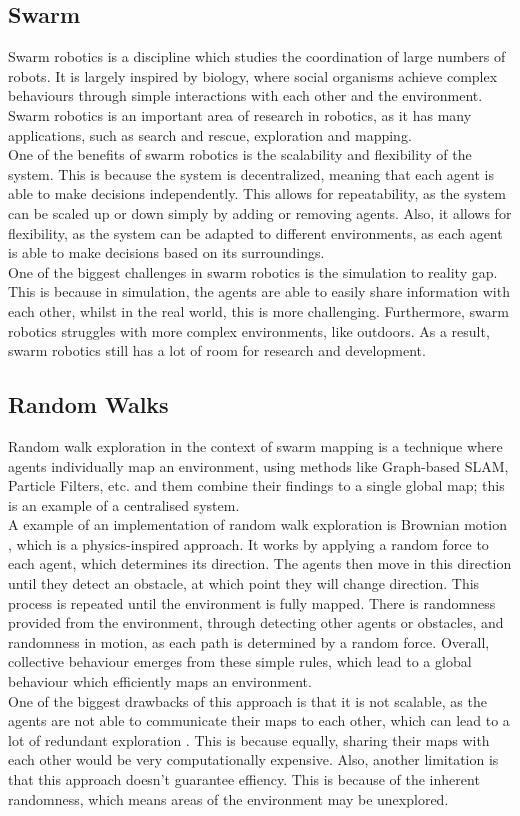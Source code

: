 \documentclass[12pt]{article}
\begin{document}
\subsection{Swarm}
Swarm robotics \cite{intro_to_swarm} is a discipline which studies the coordination of large numbers of robots. It is largely inspired by biology,
where social organisms achieve complex behaviours through simple interactions with each other and the environment. Swarm
robotics is an important area of research in robotics, as it has many applications, such as search and rescue, exploration
and mapping.\\
One of the benefits of swarm robotics is the scalability and flexibility of the system. This is because the system is
decentralized, meaning that each agent is able to make decisions independently. This allows for repeatability, as the system
can be scaled up or down simply by adding or removing agents. Also, it allows for flexibility, as the system can be adapted
to different environments, as each agent is able to make decisions based on its surroundings.\\
One of the biggest challenges in swarm robotics is the simulation to reality gap. This is because in simulation, the agents
are able to easily share information with each other, whilst in the real world, this is more challenging. Furthermore, swarm
robotics struggles with more complex environments, like outdoors. As a result, swarm robotics still has a lot of room for
research and development.

\subsection{Random Walks}
Random walk exploration in the context of swarm mapping is a technique where agents individually map an environment, using
methods like Graph-based SLAM, Particle Filters, etc. and them combine their findings to a single global map; this is an
example of a centralised system.\\
A example of an implementation of random walk exploration is Brownian motion \cite{brownian_motion}, which is a physics-inspired
approach. It works by applying a random force to each agent, which determines its direction. The agents then move in this
direction until they detect an obstacle, at which point they will change direction. This process is repeated until the
environment is fully mapped. There is randomness provided from the environment, through detecting other agents or obstacles,
and randomness in motion, as each path is determined by a random force. Overall, collective behaviour emerges from these simple
rules, which lead to a global behaviour which efficiently maps an environment.\\
One of the biggest drawbacks of this approach is that it is not scalable, as the agents are not able to communicate their
maps to each other, which can lead to a lot of redundant exploration \cite{random_walks}. This is because equally, sharing their maps with each
other would be very computationally expensive. Also, another limitation is that this approach doesn't guarantee effiency.
This is because of the inherent randomness, which means areas of the environment may be unexplored.\\
\end{document}
